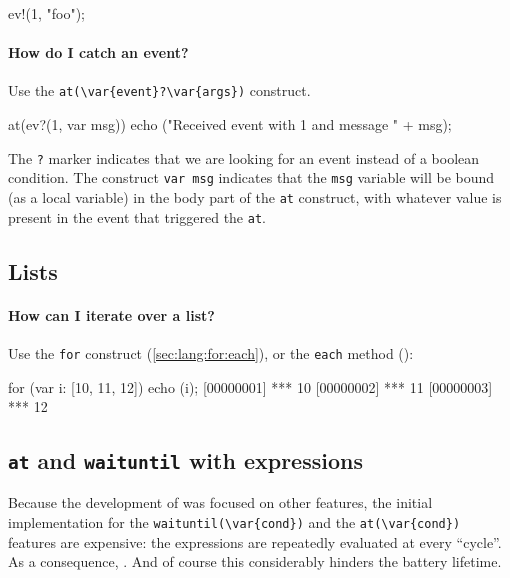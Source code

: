 \begin{urbifixme}
ev!(1, "foo");
\end{urbifixme}

\paragraph{How do I catch an event?}

Use the \lstinline|at(\var{event}?\var{args})| construct.

\begin{urbifixme}
at(ev?(1, var msg))
  echo ("Received event with 1 and message " + msg);
\end{urbifixme}

The \lstinline{?} marker indicates that we are looking for an event
instead of a boolean condition. The construct \lstinline{var msg}
indicates that the \lstinline{msg} variable will be bound (as a local
variable) in the body part of the \lstinline{at} construct, with
whatever value is present in the event that triggered the
\lstinline{at}.

\subsection{Lists}
\paragraph{How can I iterate over a list?}

Use the \lstinline{for} construct (\autoref{sec:lang:for:each}), or
the \lstinline|each| method ():

\begin{urbiscript}[firstnumber=last]
for (var i: [10, 11, 12]) echo (i);
[00000001] *** 10
[00000002] *** 11
[00000003] *** 12
\end{urbiscript}

\subsection{\lstinline|at| and \lstinline|waituntil| with expressions}
\label{sec:faq:atexp}
Because the development of \us was focused on other features, the
initial implementation for the \lstinline|waituntil(\var{cond})| and
the \lstinline|at(\var{cond})| features are expensive: the expressions
 are repeatedly evaluated at every ``cycle''.  As a
consequence, .  And of
course this considerably hinders the battery lifetime.

